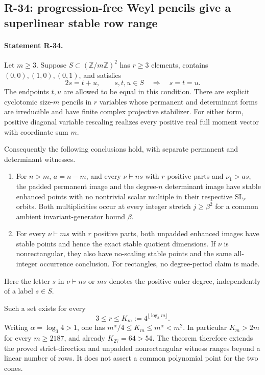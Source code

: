 \subsection{R-34: progression-free Weyl pencils give a superlinear stable row range}

\paragraph{Statement R-34.}
Let $m\geq3$. Suppose $S\subset(\mathbb Z/m\mathbb Z)^2$ has
$r\geq3$ elements, contains $(0,0),(1,0),(0,1)$, and satisfies
\begin{equation}\label{R34:AP}
 2s=t+u,\qquad s,t,u\in S
                   \quad\Longrightarrow\quad s=t=u.
\end{equation}
The endpoints $t,u$ are allowed to be equal in this condition.
There are explicit cyclotomic size-$m$ pencils in $r$ variables
whose permanent and determinant forms are irreducible and have
finite complex projective stabilizer. For either form, positive
diagonal variable rescaling realizes every positive real full
moment vector with coordinate sum $m$.

Consequently the following conclusions hold, with separate
permanent and determinant witnesses.
\begin{enumerate}
\item For $n>m$, $a=n-m$, and every $\nu\vdash ns$ with
$r$ positive parts and $\nu_1>as$, the padded permanent image
and the degree-$n$ determinant image have stable enhanced
points with no nontrivial scalar multiple in their respective
$\mathrm{SL}_r$ orbits. Both multiplicities occur at every
integer stretch $j\geq\beta^2$ for a common ambient
invariant-generator bound $\beta$.
\item For every $\nu\vdash ms$ with $r$ positive parts,
both unpadded enhanced images have stable points and hence
the exact stable quotient dimensions. If $\nu$ is
nonrectangular, they also have no-scaling stable points and
the same all-integer occurrence conclusion. For rectangles,
no degree-period claim is made.
\end{enumerate}
Here the letter $s$ in $\nu\vdash ns$ or $ms$ denotes the
positive outer degree, independently of a label $s\in S$.

Such a set exists for every
\begin{equation}\label{R34:K}
 3\leq r\leq K_m:=4^{\lfloor\log_3m\rfloor}.
\end{equation}
Writing $\alpha=\log_3 4>1$, one has
$m^\alpha/4\leq K_m\leq m^\alpha<m^2$.
In particular $K_m>2m$ for every $m\geq2187$, and already
$K_{27}=64>54$. The theorem therefore extends the proved
strict-direction and unpadded nonrectangular witness ranges
beyond a linear number of rows. It does not assert a common
polynomial point for the two cones.

